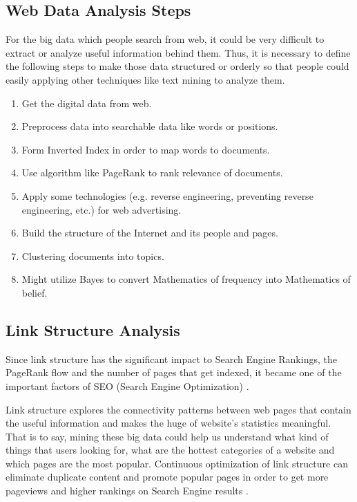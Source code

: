 \documentclass[sigconf]{acmart}
\begin{document}
\subsection{Web Data Analysis Steps}
For the big data which people search from web, it could be very difficult to extract or analyze useful information behind them. Thus, it is necessary to define the following steps to make those data structured or orderly so that people could easily applying other techniques like text mining to analyze them.
\begin{enumerate}
\item Get the digital data from web.
\item Preprocess data into searchable data like words or positions.
\item Form Inverted Index in order to map words to documents.
\item Use algorithm like PageRank to rank relevance of documents.
\item Apply some technologies (e.g. reverse engineering, preventing reverse engineering, etc.) for web advertising.
\item Build the structure of the Internet and its people and pages.
\item Clustering documents into topics.
\item Might utilize Bayes to convert Mathematics of frequency into Mathematics of belief.
\end{enumerate}

\subsection{Link Structure Analysis}
Since link structure has the significant impact to Search Engine Rankings, the PageRank flow and the number of pages that get indexed, it became one of the important factors of SEO (Search Engine Optimization) \cite{editor08}.

Link structure explores the connectivity patterns between web pages that contain the useful information and makes the huge of website’s statistics meaningful. That is to say, mining these big data could help us understand what kind of things that users looking for, what are the hottest categories of a website and which pages are the most popular. Continuous optimization of link structure can eliminate duplicate content and promote popular pages in order to get more pageviews and higher rankings on Search Engine results \cite{editor08}.
\end{document}
